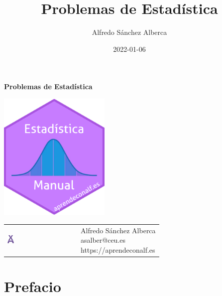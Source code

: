 \documentclass[
  a4paper,
]{scrreport}
\title{Problemas de Estadística}
\author{Alfredo Sánchez Alberca}
\date{2022-01-06}
\renewcommand*\contentsname{Tabla de contenidos}
\newcommand\contentsname{Tabla de contenidos}
\theoremstyle{definition}
\theoremstyle{remark}
\begin{document}
\begin{titlepage}

\begin{center}
\vspace*{5cm}

\Huge
{\textbf{\textsf{Problemas de Estadística}}}

\vspace{0.5cm}
\LARGE
{\textbf{\textsf{}}}

\vspace{1.5cm}

\includegraphics[width=0.4\textwidth]{img/logos/sticker.png}
\end{center}

\vfill

\begin{flushleft}
\begin{tabular}{ll}
\includegraphics[width=0.1\textwidth]{img/logos/aprendeconalf.png} & \parbox[b]{5cm}{\Large\textsf{Alfredo
Sánchez
Alberca}\\ \textsf{asalber@ceu.es} \\ \textsf{https://aprendeconalf.es}}
\end{tabular}
\end{flushleft}
\end{titlepage}
\renewcommand*\contentsname{Tabla de contenidos}
{
\hypersetup{linkcolor=}
\setcounter{tocdepth}{2}
\tableofcontents
}

\chapter*{Prefacio}\label{prefacio}
\end{document}
